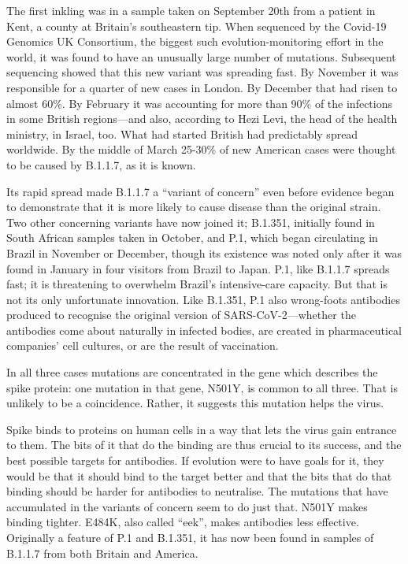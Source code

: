 \documentclass{article}
\begin{document}
The first inkling was in a sample taken on September 20th from a patient in Kent, a county at Britain's southeastern tip. When sequenced by the Covid-19 Genomics UK Consortium, the biggest such evolution-monitoring effort in the world, it was found to have an unusually large number of mutations. Subsequent sequencing showed that this new variant was spreading fast. By November it was responsible for a quarter of new cases in London. By December that had risen to almost 60\%. By February it was accounting for more than 90\% of the infections in some British regions---and also, according to Hezi Levi, the head of the health ministry, in Israel, too. What had started British had predictably spread worldwide. By the middle of March 25-30\% of new American cases were thought to be caused by B.1.1.7, as it is known. 

Its rapid spread made B.1.1.7 a ``variant of concern'' even before evidence began to demonstrate that it is more likely to cause disease than the original strain. Two other concerning variants have now joined it; B.1.351, initially found in South African samples taken in October, and P.1, which began circulating in Brazil in November or December, though its existence was noted only after it was found in January in four visitors from Brazil to Japan. P.1, like B.1.1.7 spreads fast; it is threatening to overwhelm Brazil's intensive-care capacity. But that is not its only unfortunate innovation. Like B.1.351, P.1 also wrong-foots antibodies produced to recognise the original version of SARS-CoV-2---whether the antibodies come about naturally in infected bodies, are created in pharmaceutical companies' cell cultures, or are the result of vaccination. 

In all three cases mutations are concentrated in the gene which describes the spike protein: one mutation in that gene, N501Y, is common to all three. That is unlikely to be a coincidence. Rather, it suggests this mutation helps the virus. 

Spike binds to proteins on human cells in a way that lets the virus gain entrance to them. The bits of it that do the binding are thus crucial to its success, and the best possible targets for antibodies. If evolution were to have goals for it, they would be that it should bind to the target better and that the bits that do that binding should be harder for antibodies to neutralise. The mutations that have accumulated in the variants of concern seem to do just that. N501Y makes binding tighter. E484K, also called ``eek'', makes antibodies less effective. Originally a feature of P.1 and B.1.351, it has now been found in samples of B.1.1.7 from both Britain and America. 
\end{document}
